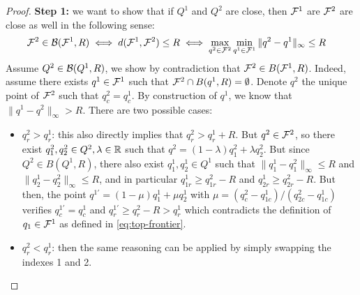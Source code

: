 \begin{subappendices}
\begin{proof}
	\textbf{Step 1:} we want to show that if $Q^1$ and $Q^2$ are close, then $\mathcal{F}^1$ are $\mathcal{F}^2$ are close as well in the following sense:
	\begin{align}
	\mathcal{F}^2\in\mathcal{B}(\mathcal{F}^1, R) &\iff d(\mathcal{F}^1, \mathcal{F}^2) \leq R \iff \max_{q^2\in\mathcal{F}^2}\min_{q^1\in\mathcal{F}^1}\|q^2-q^1\|_\infty \leq R
	\label{eq:ball-set}
	\end{align}
	Assume $Q^2\in\mathcal{B}(Q^1,R)$, we show by contradiction that $\mathcal{F}^2 \in B(\mathcal{F}^1, R)$. Indeed, assume there exists $q^1\in \mathcal{F}^1$ such that $\mathcal{F}^2 \cap B(q^1, R) = \emptyset$. Denote $q^2$ the unique point of $\mathcal{F}^2$ such that $q^2_c = q^1_c$. By construction of $q^1$, we know that $\|q^1-q^2\|_\infty > R$. There are two possible cases:
	\begin{itemize}
		\item $q^2_r > q^1_r$: this also directly implies that $q^2_r > q^1_r + R$. But $q^2\in\mathcal{F}^2$, so there exist $q^2_1, q^2_2\in Q^{2},\lambda\in\mathbb{R}$ such that $q^2 = (1-\lambda)q^2_1 + \lambda q^2_2$. But since $Q^2\in B(Q^1, R)$, there also exist $q_1^1, q^1_2\in Q^1$ such that $\|q^1_1-q^2_1\|_\infty \leq R$ and $\|q^1_2-q^2_2\|_\infty \leq R$, and in particular $q^1_{1r}\geq q^2_{1r}-R$ and $q^1_{2r}\geq q^2_{2r}-R$. But then, the point $q^{1'}=(1-\mu)q^1_1 + \mu q^1_2$ with $\mu=(q^2_c-q^1_{1c})/(q^2_{2c}-q^1_{1c})$ verifies $q^{1'}_c = q^1_c$ and $q^{1'}_r \geq q^2_r - R > q^1_r$ which contradicts the definition of $q_1\in\mathcal{F}^1$ as defined in \eqref{eq:top-frontier}.
		\item $q^2_r < q^1_r$: then the same reasoning can be applied by simply swapping the indexes 1 and 2.
	\end{itemize}
	
	

\end{proof}
\end{subappendices}
